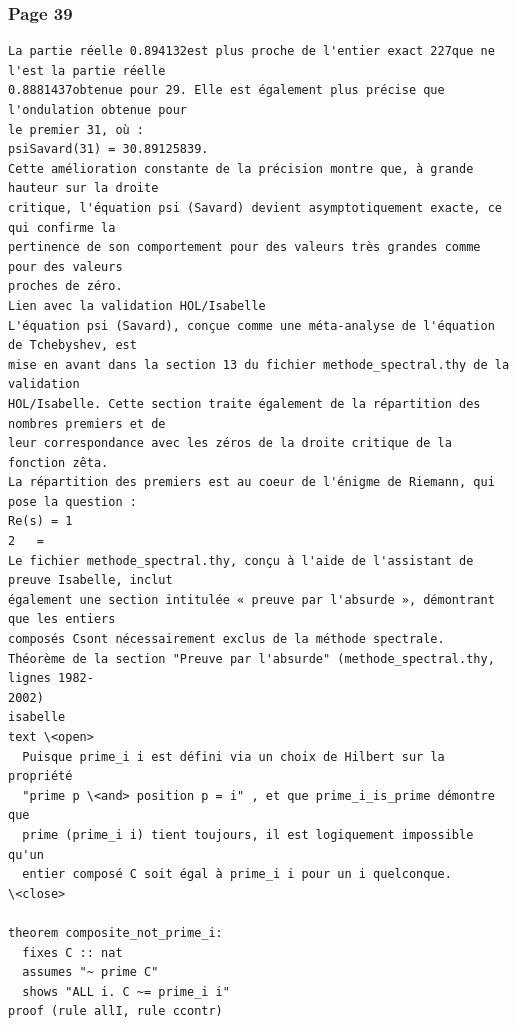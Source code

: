 \documentclass[11pt,a4paper]{article}
\begin{document}
\subsubsection*{Page 39}
\begin{Verbatim}[fontsize=\footnotesize]
La partie réelle 0.894132est plus proche de l'entier exact 227que ne l'est la partie réelle 
0.8881437obtenue pour 29. Elle est également plus précise que l'ondulation obtenue pour 
le premier 31, où : 
psiSavard(31) = 30.89125839. 
Cette amélioration constante de la précision montre que, à grande hauteur sur la droite 
critique, l'équation psi (Savard) devient asymptotiquement exacte, ce qui confirme la 
pertinence de son comportement pour des valeurs très grandes comme pour des valeurs 
proches de zéro. 
Lien avec la validation HOL/Isabelle 
L'équation psi (Savard), conçue comme une méta-analyse de l'équation de Tchebyshev, est 
mise en avant dans la section 13 du fichier methode_spectral.thy de la validation 
HOL/Isabelle. Cette section traite également de la répartition des nombres premiers et de 
leur correspondance avec les zéros de la droite critique de la fonction zêta. 
La répartition des premiers est au coeur de l'énigme de Riemann, qui pose la question : 
Re(s) = 1
2   = 
Le fichier methode_spectral.thy, conçu à l'aide de l'assistant de preuve Isabelle, inclut 
également une section intitulée « preuve par l'absurde », démontrant que les entiers 
composés Csont nécessairement exclus de la méthode spectrale. 
Théorème de la section "Preuve par l'absurde" (methode_spectral.thy, lignes 1982-
2002) 
isabelle 
text \<open> 
  Puisque prime_i i est défini via un choix de Hilbert sur la propriété
  "prime p \<and> position p = i" , et que prime_i_is_prime démontre que
  prime (prime_i i) tient toujours, il est logiquement impossible qu'un 
  entier composé C soit égal à prime_i i pour un i quelconque.
\<close> 
 
theorem composite_not_prime_i: 
  fixes C :: nat 
  assumes "~ prime C" 
  shows "ALL i. C ~= prime_i i" 
proof (rule allI, rule ccontr) 
\end{Verbatim}
\medskip
\end{document}
